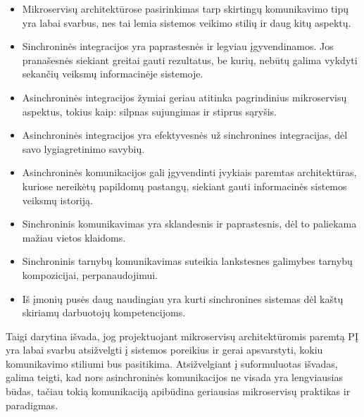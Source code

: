 \begin{itemize}
  \item Mikroservisų architektūrose pasirinkimas tarp skirtingų komunikavimo tipų yra labai svarbus, nes tai lemia sistemos veikimo stilių ir daug kitų aspektų.
	\item Sinchroninės integracijos yra paprastesnės ir legviau įgyvendinamos. Jos pranašesnės siekiant greitai gauti rezultatus, be kurių, nebūtų galima vykdyti
	sekančių veiksmų informacinėje sistemoje.
	\item Asinchroninės integracijos žymiai geriau atitinka pagrindinius mikroservisų aspektus, tokius kaip: silpnas sujungimas ir stiprus sąryšis.
	\item Asinchroninės integracijos yra efektyvesnės už sinchronines integracijas, dėl savo lygiagretinimo savybių.
	\item Asinchroninės komunikacijos gali įgyvendinti įvykiais paremtas architektūras, kuriose nereikėtų papildomų pastangų, siekiant gauti informacinės sistemos veiksmų istoriją.
	\item Sinchroninis komunikavimas yra sklandesnis ir paprastesnis, dėl to paliekama mažiau vietos klaidoms.
	\item Sinchroninis tarnybų komunikavimas suteikia lankstesnes galimybes tarnybų kompozicijai, perpanaudojimui.
	\item Iš įmonių pusės daug naudingiau yra kurti sinchronines sistemas dėl kaštų skiriamų darbuotojų kompetencijoms.
\end{itemize}

Taigi darytina išvada, jog projektuojant mikroservisų architektūromis paremtą PĮ yra labai svarbu atsižvelgti į sistemos poreikius ir gerai apsvarstyti, kokiu komunikavimo
stiliumi bus pasitikima. Atsižvelgiant į suformuluotas išvadas, galima teigti, kad nors asinchroninės komunikacijos ne visada yra lengviausias būdas, tačiau 
tokią komunikaciją apibūdina geriausias mikroservisų praktikas ir paradigmas.

